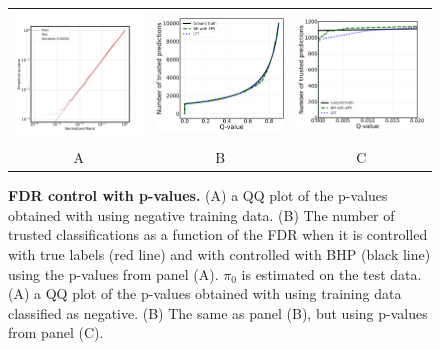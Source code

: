 \documentclass{article}
\begin{document}
\begin{figure}
        \advance\leftskip-0.5cm
	\begin{tabular}{ccc}
 		\includegraphics[width=2.5in]{img/cnn_QQ_classical.pdf} &
		\includegraphics[width=2.5in]{img/cnn_classical_fdr_control.pdf} & 
            \includegraphics[width=2.5in]{img/cnn_classical_fdr_control_loc.pdf}
		\\
		A & B & C
	\end{tabular}
	\caption{{\bf FDR control with p-values.}
		(A) a QQ plot of the p-values obtained with using negative training data. (B) The number of trusted classifications as a function of the FDR when it is controlled with true labels (red line) and with controlled with BHP (black line) using the p-values from panel (A). $\pi_0$ is estimated on the test data.
		(A) a QQ plot of the p-values obtained with using training data classified as negative. (B) The same as panel (B), but using p-values from panel (C).
	}
	\label{fig:classical}
\end{figure}  
\end{document}
